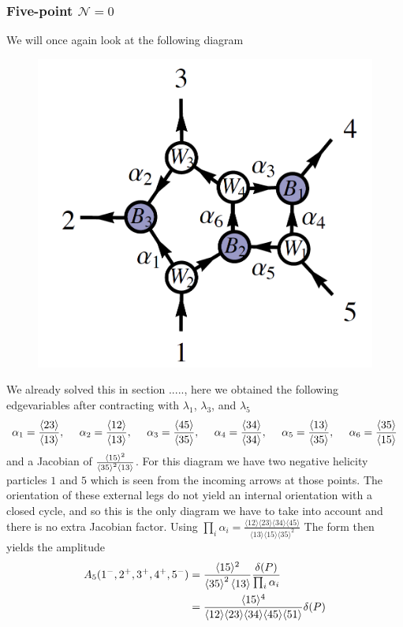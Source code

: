 \documentclass[letter,11pt]{article}
\newcommand{\ab}[1]{\langle #1 \rangle}
\begin{document}
\subsubsection{Five-point $\mathcal{N}=0$}
We will once again look at the following diagram
\begin{figure}[H]
	\centering
	\includegraphics[width=0.3\linewidth]{5pt}
	\caption{}
	\label{fig:5pt}
\end{figure}
We already solved this in section ....., here we obtained
the following edgevariables after contracting with $\lambda_1$, $\lambda_3$, and $\lambda_5$
\begin{equation}
	\begin{aligned}
		\alpha_1=\frac{\expval{23}}{\expval{13}},~~~~
		\alpha_2=\frac{\expval{12}}{\expval{13}},~~~~
		\alpha_3=\frac{\expval{45}}{\expval{35}},~~~~
		\alpha_4=\frac{\expval{34}}{\expval{34}},~~~~
		\alpha_5=\frac{\expval{13}}{\expval{35}},~~~~
		\alpha_6=\frac{\expval{35}}{\expval{15}}
	\end{aligned}
\end{equation}
and a Jacobian of $\frac{\ab{15}^2}{\expval{35}^2\expval{13}}$. For this diagram we have two negative helicity particles $1$ and $5$ which is seen from the incoming arrows at those points. The orientation of these external legs do not yield an internal orientation with a closed cycle, and so this is the only diagram we have to take into account and there is no extra Jacobian factor. Using $\prod_{i}\alpha_i=\frac{\ab{12}\ab{23}\ab{34}\ab{45}}{\ab{13}\ab{15}\ab{35}^2}$ The form then yields the amplitude
\begin{equation}
	\begin{aligned}
		A_5(1^-,2^+,3^+,4^+,5^-)&=\frac{\ab{15}^2}{\expval{35}^2\expval{13}}\frac{\delta(P)}{\prod_i \alpha_i}\\
		&=\frac{\ab{15}^4}{\ab{12}\ab{23}\ab{34}\ab{45}\ab{51}}\delta(P)
	\end{aligned}
\end{equation}
\end{document}
